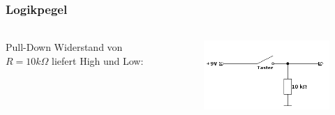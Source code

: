 \begin{frame}
    \frametitle{Logikpegel}
    \framesubtitle{}
    \begin{columns}[c]
        \begin{block}{}
                Pull-Down Widerstand von $R = 10k\Omega$ liefert High und Low:
        \end{block}
            \begin{center}
            \end{center}
        \begin{figure}[H]
        \begin{center}
                \includegraphics[scale=0.4]{./img/schaltung/logikpegel_2.png}
        \end{center}
        \end{figure}
    \end{columns}
\end{frame}

